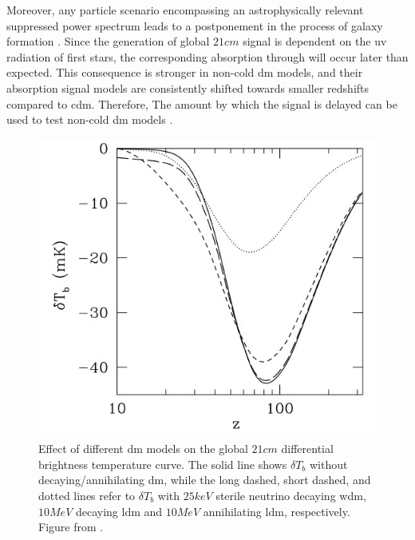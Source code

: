 \documentclass[12pt, TexShade, letterpaper]{report}
\begin{document}
Moreover, any particle  scenario encompassing an astrophysically relevant suppressed power spectrum leads to a postponement in the process of galaxy formation \cite{noncold_dm_21}. Since the generation of global $21cm$ signal is dependent on the \gls{uv} radiation of first stars, the corresponding absorption through will occur later than expected. This consequence is stronger in non-cold \gls{dm} models, and their absorption signal models are consistently shifted towards smaller redshifts compared to \gls{cdm}. Therefore, The amount by which the signal is delayed can be used to test non-cold \gls{dm} models  \cite{first_star_impact, dm_timing}.\par 

\begin{figure}[h!]
    \centering
    \includegraphics{21cm_dm.jpg}
    \caption[Effect of different \gls{dm} models on the global $21cm$ differential brightness temperature curve]{Effect of different \gls{dm} models on the global $21cm$ differential brightness temperature curve. The solid line shows $\delta T_b$ without decaying/annihilating \gls{dm}, while the long dashed, short dashed, and dotted lines refer to $\delta T_b$ with $25keV$ sterile neutrino decaying \gls{wdm}, $10 MeV$ decaying \gls{ldm} and $10MeV$ annihilating \gls{ldm}, respectively. Figure from \cite{constrain_dm_21}.}
    \label{fig:enter-label}
\end{figure}
\end{document}

